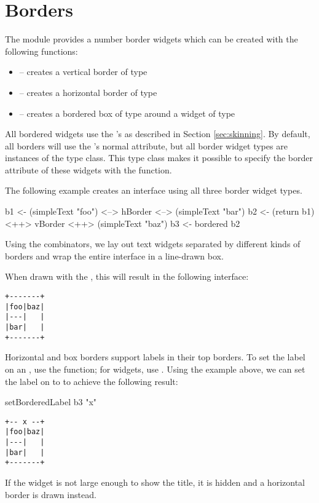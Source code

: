 \section{Borders}

The  module provides a number border widgets which can be
created with the following functions:

\begin{itemize}
\item {} -- creates a vertical border of type 
\item {} -- creates a horizontal border of type 
\item {} -- creates a bordered box of type  around a widget of type 
\end{itemize}

All bordered widgets use the 's  as
described in Section \ref{sec:skinning}.  By default, all borders will
use the 's normal attribute, but all border widget
types are instances of the  type class.  This type
class makes it possible to specify the border attribute of these
widgets with the  function.

The following example creates an interface using all three border
widget types.

\begin{haskellcode}
 b1 <- (simpleText "foo") <--> hBorder <--> (simpleText "bar")
 b2 <- (return b1) <++> vBorder <++> (simpleText "baz")
 b3 <- bordered b2
\end{haskellcode}

Using the  combinators, we lay out text widgets separated by
different kinds of borders and wrap the entire interface in a
line-drawn box.

When drawn with the , this will result in the following
interface:

\begin{verbatim}
+-------+
|foo|baz|
|---|   |
|bar|   |
+-------+
\end{verbatim}

Horizontal and box borders support labels in their top borders.  To
set the label on an , use the 
function; for  widgets, use .  Using
the example above, we can set the label on  to  to
achieve the following result:

\begin{haskellcode}
 setBorderedLabel b3 "x"
\end{haskellcode}

\begin{verbatim}
+-- x --+
|foo|baz|
|---|   |
|bar|   |
+-------+
\end{verbatim}

If the  widget is not large enough to show the title, it
is hidden and a horizontal border is drawn instead.

